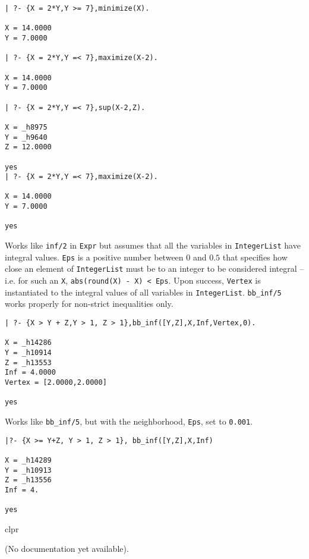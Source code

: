 \begin{description}
{\begin{verbatim}
| ?- {X = 2*Y,Y >= 7},minimize(X).

X = 14.0000
Y = 7.0000

| ?- {X = 2*Y,Y =< 7},maximize(X-2).

X = 14.0000
Y = 7.0000

| ?- {X = 2*Y,Y =< 7},sup(X-2,Z).

X = _h8975
Y = _h9640
Z = 12.0000

yes
| ?- {X = 2*Y,Y =< 7},maximize(X-2).

X = 14.0000
Y = 7.0000

yes
\end{verbatim}
}


Works like {\tt inf/2} in {\tt Expr} but assumes that all the
variables in {\tt IntegerList} have integral values.  {\tt Eps} is a
positive number between $0$ and $0.5$ that specifies how close an
element of {\tt IntegerList} must be to an integer to be considered
integral -- i.e. for such an {\tt X}, {\tt abs(round(X) - X) < Eps}.
Upon success, {\tt Vertex} is instantiated to the integral values of
all variables in {\tt IntegerList}.  {\tt bb\_inf/5} works properly for
non-strict inequalities only.

\begin{verbatim}
| ?- {X > Y + Z,Y > 1, Z > 1},bb_inf([Y,Z],X,Inf,Vertex,0).

X = _h14286
Y = _h10914
Z = _h13553
Inf = 4.0000
Vertex = [2.0000,2.0000]

yes
\end{verbatim}


Works like {\tt bb\_inf/5}, but with the neighborhood, {\tt Eps}, set
to {\tt 0.001}.

\begin{verbatim}
|?- {X >= Y+Z, Y > 1, Z > 1}, bb_inf([Y,Z],X,Inf)

X = _h14289
Y = _h10913
Z = _h13556
Inf = 4.

yes
\end{verbatim}

 {clpr} 

(No documentation yet available).


\end{description}



